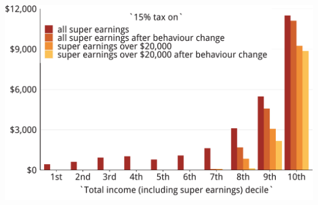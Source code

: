\documentclass[tikz]{standalone}\usepackage[]{graphicx}\usepackage[]{color}
\newenvironment{knitrout}{}{} %
\begin{document}
\begin{knitrout}
\color{fgcolor}
\includegraphics[width=11.000in,height=7.00in]{./Super-tax-targeting/b5-super-atlas/Figure6-2-orig-1} 

\end{knitrout}
\end{document}
